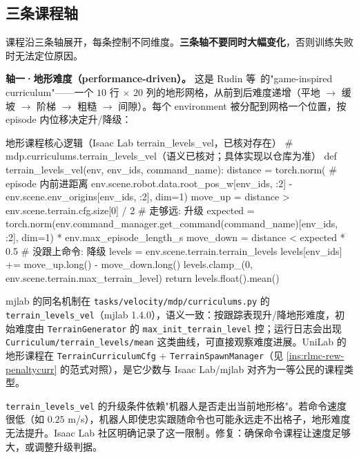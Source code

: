\subsection{三条课程轴}
\label{sec:rlmc-rew-curraxes}

课程沿三条轴展开，每条控制不同维度。\textbf{三条轴不要同时大幅变化}，否则训练失败时无法定位原因。

\textbf{轴一·地形难度（performance-driven）。} 这是 Rudin 等\,\cite{rudin2021minutes} 的"game-inspired curriculum"——一个 $10$ 行 $\times$ $20$ 列的地形网格，从前到后难度递增（平地 $\to$ 缓坡 $\to$ 阶梯 $\to$ 粗糙 $\to$ 间隙）。每个 environment 被分配到网格一个位置，按 episode 内位移决定升/降级：

\begin{codebox}[Python]{地形课程核心逻辑（Isaac Lab terrain\_levels\_vel，已核对存在）}
# mdp.curriculums.terrain_levels_vel（语义已核对；具体实现以仓库为准）
def terrain_levels_vel(env, env_ids, command_name):
    distance = torch.norm(                                       # episode 内前进距离
        env.scene.robot.data.root_pos_w[env_ids, :2]
        - env.scene.env_origins[env_ids, :2], dim=1)
    move_up = distance > env.scene.terrain.cfg.size[0] / 2       # 走够远: 升级
    expected = torch.norm(env.command_manager.get_command(command_name)[env_ids, :2],
                          dim=1) * env.max_episode_length_s
    move_down = distance < expected * 0.5                        # 没跟上命令: 降级
    levels = env.scene.terrain.terrain_levels
    levels[env_ids] += move_up.long() - move_down.long()
    levels.clamp_(0, env.scene.terrain.max_terrain_level)
    return levels.float().mean()
\end{codebox}

mjlab 的同名机制在 \verb|tasks/velocity/mdp/curriculums.py| 的 \verb|terrain_levels_vel|（mjlab 1.4.0），语义一致：按跟踪表现升/降地形难度，初始难度由 \verb|TerrainGenerator| 的 \verb|max_init_terrain_level| 控；运行日志会出现 \verb|Curriculum/terrain_levels/mean| 这类曲线，可直接观察难度进展。UniLab 的地形课程在 \verb|TerrainCurriculumCfg| $+$ \verb|TerrainSpawnManager|（见 \cref{ins:rlmc-rew-penaltycurr} 的范式对照），是它少数与 Isaac Lab/mjlab 对齐为一等公民的课程类型。

\begin{pitfall}
\verb|terrain_levels_vel| 的升级条件依赖"机器人是否走出当前地形格"。若命令速度很低（如 $0.25$ m/s），机器人即使忠实跟随命令也可能永远走不出格子，地形难度无法提升。Isaac Lab 社区明确记录了这一限制\,\cite{isaaclab2024}。修复：确保命令课程让速度足够大，或调整升级判据。
\end{pitfall}

